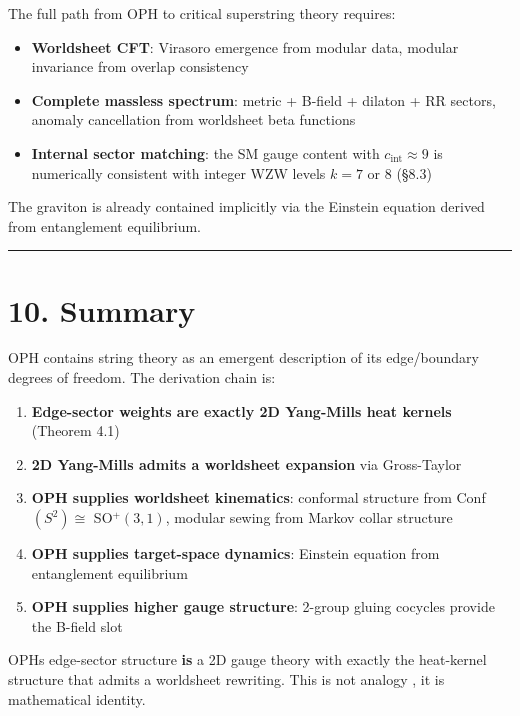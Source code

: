 The full path from OPH to critical superstring theory requires:

\begin{itemize}
\tightlist
\item
  \textbf{Worldsheet CFT}: Virasoro emergence from modular data, modular invariance from overlap consistency
\item
  \textbf{Complete massless spectrum}: metric + B-field + dilaton + RR sectors, anomaly cancellation from worldsheet beta functions
\item
  \textbf{Internal sector matching}: the SM gauge content with \(c_{\text{int}} \approx 9\) is numerically consistent with integer WZW levels \(k = 7\) or \(8\) (§8.3)
\end{itemize}

The graviton is already contained implicitly via the Einstein equation derived from entanglement equilibrium.

\begin{center}\rule{0.5\linewidth}{0.5pt}\end{center}

\section{10. Summary}\label{10-summary}

OPH contains string theory as an emergent description of its edge/boundary degrees of freedom. The derivation chain is:

\begin{enumerate}
\def\labelenumi{\arabic{enumi}.}
\tightlist
\item
  \textbf{Edge-sector weights are exactly 2D Yang-Mills heat kernels} (Theorem 4.1)
\item
  \textbf{2D Yang-Mills admits a worldsheet expansion} via Gross-Taylor
\item
  \textbf{OPH supplies worldsheet kinematics}: conformal structure from Conf\((S^2) \cong\) SO\(^+(3,1)\), modular sewing from Markov collar structure
\item
  \textbf{OPH supplies target-space dynamics}: Einstein equation from entanglement equilibrium
\item
  \textbf{OPH supplies higher gauge structure}: 2-group gluing cocycles provide the B-field slot
\end{enumerate}

OPH\textquotesingle s edge-sector structure \textbf{is} a 2D gauge theory with exactly the heat-kernel structure that admits a worldsheet rewriting. This is not analogy , it is mathematical identity.

